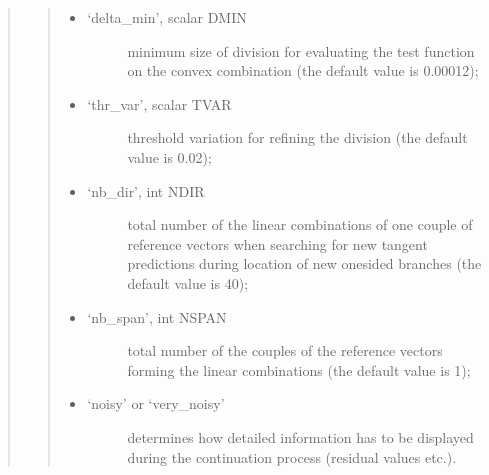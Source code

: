 \documentclass[a4paper,11pt,english]{sphinxmanual}
\begin{document}
\begin{quote}
\begin{quote}
\begin{itemize}
\begin{description}
\end{description}

\item {} \begin{description}
\item[{‘delta\_min’, scalar DMIN}] \leavevmode
\sphinxAtStartPar
minimum size of division for evaluating the test function on the
convex combination (the default value is 0.00012);

\end{description}

\item {} \begin{description}
\item[{‘thr\_var’, scalar TVAR}] \leavevmode
\sphinxAtStartPar
threshold variation for refining the division (the default value is
0.02);

\end{description}

\item {} \begin{description}
\item[{‘nb\_dir’, int NDIR}] \leavevmode
\sphinxAtStartPar
total number of the linear combinations of one couple of reference
vectors when searching for new tangent predictions during location of
new one\sphinxhyphen{}sided branches (the default value is 40);

\end{description}

\item {} \begin{description}
\item[{‘nb\_span’, int NSPAN}] \leavevmode
\sphinxAtStartPar
total number of the couples of the reference vectors forming the
linear combinations (the default value is 1);

\end{description}

\item {} \begin{description}
\item[{‘noisy’ or ‘very\_noisy’}] \leavevmode
\sphinxAtStartPar
determines how detailed information has to be displayed during the
continuation process (residual values etc.).

\end{description}

\end{itemize}
\end{quote}
\end{quote}
\end{document}
